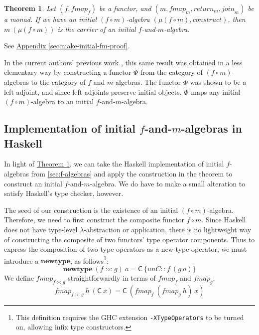 \documentclass{jfp1}
\newtheorem{theorem}{Theorem}
\newcommand{\thmref}[1]{\hyperref[#1]{Theorem \ref*{#1}}}
\newcommand{\appendixref}[1]{\hyperref[#1]{Appendix \ref*{#1}}}
\newcommand{\kw}[1]{\textbf{#1}}
\begin{document}
\begin{theorem}\label{thm:make-initial-f-and-m-alg}
  Let $(f, \mathit{fmap}_f)$ be a functor, and $(m, \mathit{fmap}_m,
  \mathit{return}_m, \mathit{join}_m)$ be a monad.  If we have an
  initial $(f \circ m)$-algebra $(\mu(f \circ m),
  \mathit{construct})$, then $m~(\mu(f \circ m))$ is the carrier of an
  initial $f$-and-$m$-algebra.
\end{theorem}

\begin{proof*}
  See \appendixref{sec:make-initial-fm-proof}.
\end{proof*}

In the current authors' previous work \cite{atkey12fibrational}, this
same result was obtained in a less elementary way by constructing a
functor $\Phi$ from the category of $(f \circ m)$-algebras to the
category of $f$-and-$m$-algebras. The functor $\Phi$ was shown to be a
left adjoint, and since left adjoints preserve initial objects, $\Phi$
maps any initial $(f \circ m)$-algebra to an initial
$f$-and-$m$-algebra.


\subsection{Implementation of initial \texorpdfstring{$f$}{f}-and-\texorpdfstring{$m$}{m}-algebras in Haskell}
\label{sec:f-and-m-alg-impl}

\newcommand{\fcompose}{\mathop{\mathord:\circ\mathord:}}

In light of \thmref{thm:make-initial-f-and-m-alg}, we can take the
Haskell implementation of initial $f$-algebras from
\autoref{sec:f-algebras} and apply the construction in the
theorem to construct an initial $f$-and-$m$-algebra. We do have to
make a small alteration to satisfy Haskell's type checker, however.

The seed of our construction is the existence of an initial $(f \circ
m)$-algebra. Therefore, we need to first construct the composite
functor $f \circ m$. Since Haskell does not have type-level
$\lambda$-abstraction or application, there is no lightweight way of
constructing the composite of two functors' type operator
components. Thus to express the composition of two type operators as
a new type operator, we must introduce a $\kw{newtype}$, as
follows\footnote{This definition requires the GHC extension
  \texttt{-XTypeOperators} to be turned on, allowing infix type
  constructors.}:
\begin{displaymath}
  \kw{newtype}~(f \fcompose g)~a = \mathsf{C}~\{\mathit{unC} :: f~(g~a) \}
\end{displaymath}
We define $\mathit{fmap}_{f\fcompose g}$ straightforwardly in terms of
$\mathit{fmap}_f$ and $\mathit{fmap}_g$:
\begin{displaymath}
  \mathit{fmap}_{f\fcompose g}~h~(\mathsf{C}~x) = \mathsf{C}~(\mathit{fmap}_f~(\mathit{fmap}_g~h)~x)
\end{displaymath}
\end{document}
